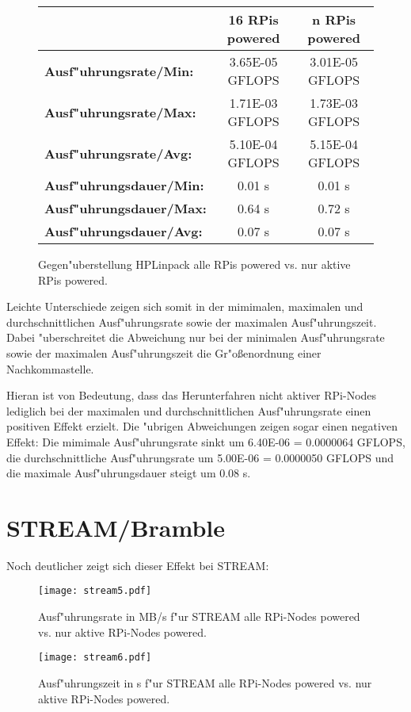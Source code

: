 \begin{figure}[h!]
  \centering
  \begin{tabular}{|l|c|c|}
    \hline 
     & \textbf{16 RPis powered} & \textbf{n RPis powered}\\ 
    \hline 
    \textbf{Ausf"uhrungsrate/Min:} & 3.65E-05 GFLOPS & 3.01E-05 GFLOPS \\
    \hline 
    \textbf{Ausf"uhrungsrate/Max:} & 1.71E-03 GFLOPS & 1.73E-03 GFLOPS \\
    \hline 
    \textbf{Ausf"uhrungsrate/Avg:} & 5.10E-04 GFLOPS & 5.15E-04 GFLOPS \\
    \hline 
    \textbf{Ausf"uhrungsdauer/Min:} & 0.01 s & 0.01 s \\
    \hline 
    \textbf{Ausf"uhrungsdauer/Max:} & 0.64 s & 0.72 s \\
	\hline 
    \textbf{Ausf"uhrungsdauer/Avg:} & 0.07 s & 0.07 s\\
    \hline
  \end{tabular}
  \caption{Gegen"uberstellung HPLinpack alle RPis powered vs. nur aktive RPis powered.}\label{fig:hpl-vgl}
\end{figure}
\noindent
Leichte Unterschiede zeigen sich somit in der mimimalen, maximalen und durchschnittlichen Ausf"uhrungsrate sowie der maximalen Ausf"uhrungszeit. Dabei "uberschreitet die Abweichung nur bei der minimalen Ausf"uhrungsrate sowie der maximalen Ausf"uhrungszeit die Gr"o\ss enordnung einer Nachkommastelle. 

Hieran ist von Bedeutung, dass das Herunterfahren nicht aktiver RPi-Nodes lediglich bei der maximalen und durchschnittlichen Ausf"uhrungsrate einen positiven Effekt erzielt. Die "ubrigen Abweichungen zeigen sogar einen negativen Effekt: Die mimimale Ausf"uhrungsrate sinkt um 6.40E-06 = 0.0000064 GFLOPS, die durchschnittliche Ausf"uhrungsrate um 5.00E-06 = 0.0000050 GFLOPS und die maximale Ausf"uhrungsdauer steigt um 0.08 s. 

\section{STREAM/Bramble}\label{interpret-stream}

Noch deutlicher zeigt sich dieser Effekt bei STREAM: 

\begin{figure}[h!]
  \centering
  \texttt{[image: stream5.pdf]}\\ 
  \caption{Ausf"uhrungsrate in MB/s f"ur STREAM alle RPi-Nodes powered vs. nur aktive RPi-Nodes powered.}\label{fig:stream5}
\end{figure}
\begin{figure}[htb]
  \centering
  \texttt{[image: stream6.pdf]}\\ 
  \caption{Ausf"uhrungszeit in s f"ur STREAM alle RPi-Nodes powered vs. nur aktive RPi-Nodes powered.}\label{fig:stream6}
\end{figure}

